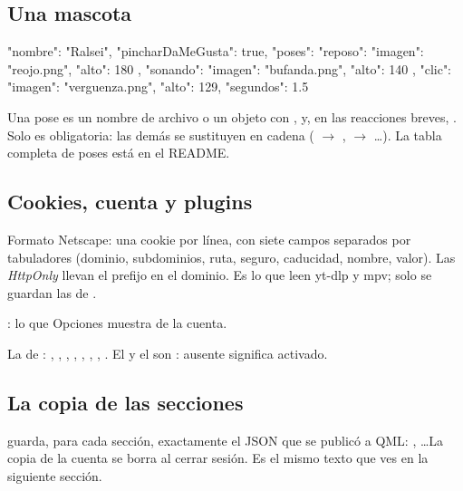 \subsection{Una mascota}

\begin{codigo}
{
  "nombre": "Ralsei",
  "pincharDaMeGusta": true,
  "poses": {
    "reposo":  { "imagen": "reojo.png",   "alto": 180 },
    "sonando": { "imagen": "bufanda.png", "alto": 140 },
    "clic":    { "imagen": "verguenza.png", "alto": 129, "segundos": 1.5 }
  }
}
\end{codigo}

Una pose es un nombre de archivo o un objeto con ,  y, en las
reacciones breves, . Solo  es obligatoria: las demás se sustituyen
en cadena ( $\rightarrow$ ,  $\rightarrow$ \dots).
La tabla completa de poses está en el README.

\subsection{Cookies, cuenta y plugins}

\begin{description}[style=nextline, leftmargin=0pt]
  \item[\texttt{cookies.txt}] Formato Netscape: una cookie por línea, con siete campos
  separados por tabuladores (dominio, subdominios, ruta, seguro, caducidad, nombre, valor).
  Las \emph{HttpOnly} llevan el prefijo  en el dominio. Es lo que leen yt-dlp
  y mpv; solo se guardan las de .
  \item[\texttt{account.json}] : lo que Opciones
  muestra de la cuenta.
  \item[\texttt{plugins.json}] La  de : ,
  , , , , ,
  , . El  y el  son
  : ausente significa activado.
\end{description}

\subsection{La copia de las secciones}

 guarda, para cada sección, exactamente el JSON que se publicó a QML:
, \dots La copia de la
cuenta se borra al cerrar sesión. Es el mismo texto que ves en la siguiente sección.


